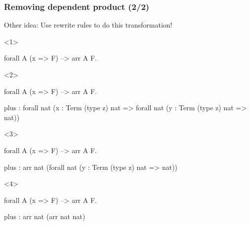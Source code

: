 \documentclass[usenames, dvipsnames]{beamer}
\begin{document}
\begin{frame}[fragile]
  \frametitle{Removing dependent product (2/2)}

  Other idea: Use \alert{rewrite rules} to do this transformation!

  \begin{onlyenv}<1>
    \begin{dedukti}
[A,F] forall A (x => F) --> arr A F.
    \end{dedukti}
  \end{onlyenv}

  \begin{onlyenv}<2>
    \begin{dedukti}
[A,F] forall A (x => F) --> arr A F.
    \end{dedukti}

    \begin{dedukti}
plus : forall nat (x : Term (type z) nat => 
       forall nat (y : Term (type z) nat =>
              nat))
    \end{dedukti}
  \end{onlyenv}

  \begin{onlyenv}<3>
    \begin{dedukti}
[A,F] forall A (x => F) --> arr A F.
    \end{dedukti}

    \begin{dedukti}
plus : arr    nat 
      (forall nat (y : Term (type z) nat => 
              nat))
    \end{dedukti}
  \end{onlyenv}

  \begin{onlyenv}<4>
    \begin{dedukti}
[A,F] forall A (x => F) --> arr A F.
    \end{dedukti}

    \begin{dedukti}
plus : arr    nat 
      (arr    nat 
              nat)
    \end{dedukti}
  \end{onlyenv}
\end{frame}
\end{document}
